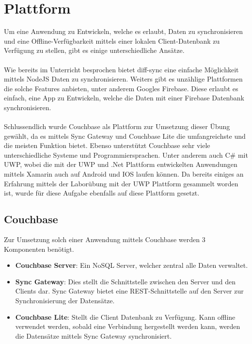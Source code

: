 
\section{Plattform}

Um eine Anwendung zu Entwickeln, welche es erlaubt, Daten zu synchronisieren und eine Offline-Verfügbarkeit mittels einer lokalen Client-Datenbank zu Verfügung zu stellen, gibt es einige unterschiedliche Ansätze.
\\\\
Wie bereits im Unterricht besprochen bietet diff-sync eine einfache Möglichkeit mittels NodeJS Daten zu synchronisieren. Weiters gibt es unzählige Plattformen die solche Features anbieten, unter anderem Googles Firebase. Diese erlaubt es einfach, eine App zu Entwickeln, welche die Daten mit einer Firebase Datenbank synchronisieren. \cite{firebase}
\\\\
Schlussendlich wurde Couchbase als Plattform zur Umsetzung dieser Übung gewählt, da es mittels Sync Gateway und Couchbase Lite die umfangreichste und die meisten Funktion bietet. Ebenso unterstützt Couchbase sehr viele unterschiedliche Systeme und Programmiersprachen. Unter anderem auch C\# mit UWP, wobei die mit der UWP und .Net Plattform entwickelten Anwendungen mittels Xamarin auch auf Android und IOS laufen können. Da bereits einiges an Erfahrung mittels der Laborübung mit der UWP Plattform gesammelt worden ist, wurde für diese Aufgabe ebenfalls auf diese Plattform gesetzt.

\subsection{Couchbase}

Zur Umsetzung solch einer Anwendung mittels Couchbase werden 3 Komponenten benötigt.

\begin{itemize}
	\item \textbf{Couchbase Server}: Ein NoSQL Server, welcher zentral alle Daten verwaltet.
	\item \textbf{Sync Gateway}: Dies stellt die Schnittstelle zwischen den Server und den Clients dar. Sync Gateway bietet eine REST-Schnittstelle auf den Server zur Synchronisierung der Datensätze.
	\item \textbf{Couchbase Lite}: Stellt die Client Datenbank zu Verfügung. Kann offline verwendet werden, sobald eine Verbindung hergestellt werden kann, werden die Datensätze mittels Sync Gateway synchronisiert.
\end{itemize}

